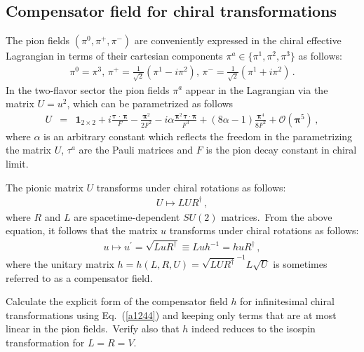 \documentclass[11pt]{latex/exercise}
\begin{document}
\subsection{Compensator field for chiral transformations}
\noindent
The pion fields $(\pi^0, \pi^+, \pi^-)$ are conveniently expressed in the chiral effective Lagrangian in terms of their cartesian components $\pi^a \in \{ \pi^1, \pi^2, \pi^3\}$ as follows:
\begin{eqnarray}
    \pi^0
    =
    \pi^3
    ,\,
    \pi^+
    =
    \frac{1}{\sqrt{2}} \left( \pi^1 - i  \pi^2 \right)
    ,\,
    \pi^-
    =
    \frac{1}{\sqrt{2}} \left( \pi^1 + i  \pi^2 \right)
    \,.
    \label{PhyIso}
\end{eqnarray}
In the two-flavor sector the pion fields $\pi^a$ appear in the Lagrangian via the matrix $U = u^2$, which can be parametrized as follows
\begin{eqnarray}
    U
    &=&
    \mathbf{1}_{2\times 2} + i \frac{\boldsymbol{\tau}\,{\cdot}\,\boldsymbol{\pi}}{F} - \frac{\boldsymbol{\pi}^2}{2 F^2} -  i \alpha \frac{\boldsymbol{\pi}^2 \, \boldsymbol{\tau}{\cdot}{\boldsymbol{\pi}}}{F^3} + (8 \alpha -1)\frac{\boldsymbol{\pi}^4}{8 F^2} + \mathcal{O}(\boldsymbol{\pi}^5)    %
    \label{a1244}
    \,,
\end{eqnarray}
where $\alpha$ is an arbitrary constant which reflects the freedom in the parametrizing the matrix $U$, $\tau^a$ are the Pauli matrices and $F$ is the pion decay constant in chiral limit.~

The pionic matrix $U$ transforms under  chiral rotations as follows:
\begin{eqnarray}
    U
    \mapsto  L U R^\dagger
    \,,
\end{eqnarray}
where $R$ and $L$ are spacetime-dependent $SU(2)$ matrices.~From the above equation, it follows that the matrix $u$ transforms under chiral rotations as follows:
\begin{eqnarray}
    u
    \mapsto  u^\prime = \sqrt{L u R^\dagger} \equiv L u h^{-1} = h u R^\dagger
    \,,
\end{eqnarray}
where the unitary matrix $h = h(L, R, U) = \sqrt{L U R^\dagger}^{-1} L \sqrt{U}$ is sometimes referred to as a compensator field.

Calculate the explicit form of the compensator field $h$ for infinitesimal chiral transformations using Eq.~(\ref{a1244}) and keeping only terms that are at most linear in the pion fields.~Verify also that $h$ indeed reduces to the isospin transformation for $L = R = V$.
\end{document}
